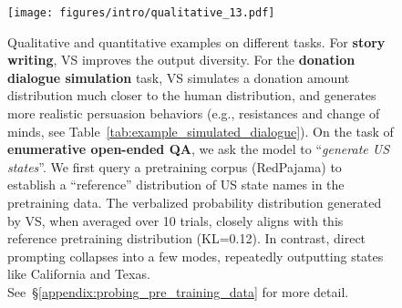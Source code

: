 



\begin{figure}
    \centering
    \texttt{[image: figures/intro/qualitative\_13.pdf]}
    \caption{Qualitative and quantitative examples on different tasks. For \textbf{story writing}, VS improves the output diversity. For the \textbf{donation dialogue simulation} task, VS simulates a donation amount distribution much  closer to the human distribution, and generates more realistic persuasion behaviors (e.g., resistances and change of minds, see Table~\ref{tab:example_simulated_dialogue}). On the task of \textbf{enumerative open-ended QA}, we ask the model to ``\textit{generate US states}''. We first query a pretraining corpus (RedPajama) to establish a ``reference'' distribution of US state names in the pretraining data. The verbalized probability distribution generated by VS, when averaged over 10 trials, closely aligns with this reference pretraining distribution (KL=0.12). In contrast, direct prompting collapses into a few modes, repeatedly outputting states like California and Texas. See~\S\ref{appendix:probing_pre_training_data} for more detail. %
    \vspace{-1em}
    }
    \label{fig:qualitative}
\end{figure}



